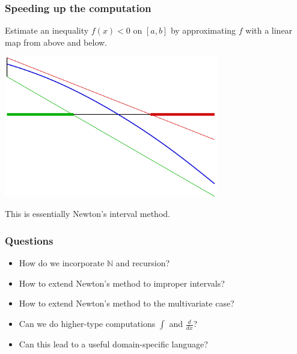 \documentclass{beamer}
\newcommand{\NN}{\mathbb{N}}
\begin{document}
\begin{frame}
  \frametitle{Speeding up the computation}

  Estimate an inequality $f(x) < 0$ on $[a,b]$ by approximating $f$
  with a linear map from above and below.

  \begin{center}
    \includegraphics[width=0.7\textwidth]{newton}
  \end{center}

  This is essentially Newton's interval method.

\end{frame}

\begin{frame}
  \frametitle{Questions}

  \begin{itemize}
  \item How do we incorporate $\NN$ and recursion?
  \item How to extend Newton's method to improper intervals?
  \item How to extend Newton's method to the multivariate case?
  \item Can we do higher-type computations $\int$ and $\frac{d}{dx}$?
  \item Can this lead to a useful domain-specific language?
  \end{itemize}
\end{frame}
\end{document}
